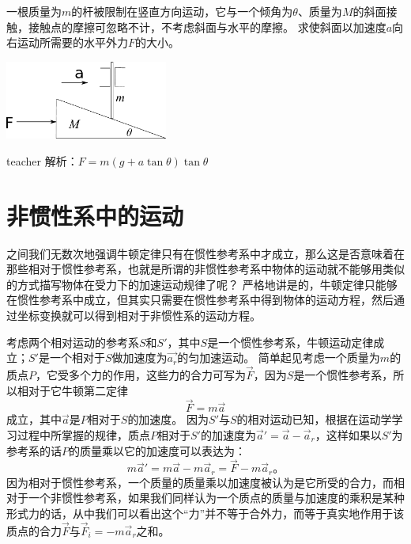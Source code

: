 \begin{example}
	一根质量为$m$的杆被限制在竖直方向运动，它与一个倾角为$\theta$、质量为$M$的斜面接触，接触点的摩擦可忽略不计，不考虑斜面与水平的摩擦。
	求使斜面以加速度$a$向右运动所需要的水平外力$F$的大小。
		\begin{flushright}
			\includegraphics[width = 0.4\textwidth]{images/newton-12.pdf} 
		\end{flushright}
	\begin{taggedblock}{teacher}
		\noindent
		解析：$F=m(g+a\tan\theta)\tan\theta$
	\end{taggedblock}
\end{example}

\section{非惯性系中的运动}

之间我们无数次地强调牛顿定律只有在惯性参考系中才成立，那么这是否意味着在那些相对于惯性参考系，也就是所谓的非惯性参考系中物体的运动就不能够用类似的方式描写物体在受力下的加速运动规律了呢？
严格地讲是的，牛顿定律只能够在惯性参考系中成立，但其实只需要在惯性参考系中得到物体的运动方程，然后通过坐标变换就可以得到相对于非惯性系的运动方程。


考虑两个相对运动的参考系$S$和$S'$，其中$S$是一个惯性参考系，牛顿运动定律成立；$S'$是一个相对于$S$做加速度为$\vec{a_r}$的匀加速运动。
简单起见考虑一个质量为$m$的质点$P$，它受多个力的作用，这些力的合力可写为$\vec{F}$，因为$S$是一个惯性参考系，所以相对于它牛顿第二定律
\[
\vec{F} = m\vec{a}
\]
成立，其中$\vec{a}$是$P$相对于$S$的加速度。
因为$S'$与$S$的相对运动已知，根据在运动学学习过程中所掌握的规律，质点$P$相对于$S'$的加速度为$\vec{a}' = \vec{a}-\vec{a}_r$，这样如果以$S'$为参考系的话$P$的质量乘以它的加速度可以表达为：
\[
m\vec{a}' = m\vec{a}-m\vec{a}_r = \vec{F}-m\vec{a}_r。
\]
因为相对于惯性参考系，一个质量的质量乘以加速度被认为是它所受的合力，而相对于一个非惯性参考系，如果我们同样认为一个质点的质量与加速度的乘积是某种形式力的话，从中我们可以看出这个“力”并不等于合外力，而等于真实地作用于该质点的合力$\vec{F}$与$\vec{F}_i = -m\vec{a}_r$之和。

